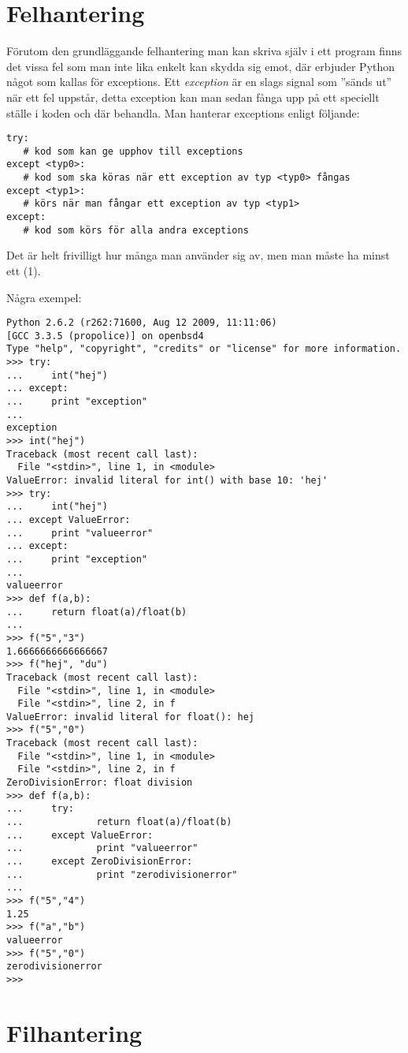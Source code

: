 \section{Felhantering}

Förutom den grundläggande felhantering man kan skriva själv i ett program finns
det vissa fel som man inte lika enkelt kan skydda sig emot, där erbjuder Python
något som kallas för exceptions. Ett \emph{exception} är en slags signal som
''sänds ut'' när ett fel uppstår, detta exception kan man sedan fånga upp på
ett speciellt ställe i koden och där behandla. Man hanterar exceptions enligt
följande:
\begin{lstlisting}
try:
   # kod som kan ge upphov till exceptions
except <typ0>:
   # kod som ska köras när ett exception av typ <typ0> fångas
except <typ1>:
   # körs när man fångar ett exception av typ <typ1>
except:
   # kod som körs för alla andra exceptions
\end{lstlisting}
Det är helt frivilligt hur många  man använder sig av, men man
måste ha minst ett (1).

Några exempel:
\begin{lstlisting}[style=text]
Python 2.6.2 (r262:71600, Aug 12 2009, 11:11:06)
[GCC 3.3.5 (propolice)] on openbsd4
Type "help", "copyright", "credits" or "license" for more information.
>>> try:
...     int("hej")
... except:
...     print "exception"
...
exception
>>> int("hej")
Traceback (most recent call last):
  File "<stdin>", line 1, in <module>
ValueError: invalid literal for int() with base 10: 'hej'
>>> try:
...     int("hej")
... except ValueError:
...     print "valueerror"
... except:
...     print "exception"
...
valueerror
>>> def f(a,b):
...     return float(a)/float(b)
...
>>> f("5","3")
1.6666666666666667
>>> f("hej", "du")
Traceback (most recent call last):
  File "<stdin>", line 1, in <module>
  File "<stdin>", line 2, in f
ValueError: invalid literal for float(): hej
>>> f("5","0")
Traceback (most recent call last):
  File "<stdin>", line 1, in <module>
  File "<stdin>", line 2, in f
ZeroDivisionError: float division
>>> def f(a,b):
...     try:
...             return float(a)/float(b)
...     except ValueError:
...             print "valueerror"
...     except ZeroDivisionError:
...             print "zerodivisionerror"
...
>>> f("5","4")
1.25
>>> f("a","b")
valueerror
>>> f("5","0")
zerodivisionerror
>>>
\end{lstlisting}



\section{Filhantering}

